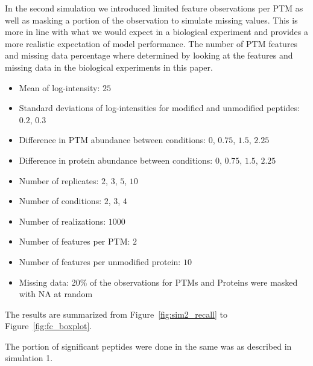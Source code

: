 \documentclass{mcp}
\def\sfigref#1{{Figure~\ref{#1}}}
\begin{document}
In the second simulation we introduced limited feature observations per PTM as well as masking a portion of the observation to simulate missing values. This is more in line with what we would expect in a biological experiment and provides a more realistic expectation of model performance. The number of PTM features and missing data percentage where determined by looking at the features and missing data in the biological experiments in this paper.

\begin{itemize}
\item Mean of log-intensity: $25$
\item Standard deviations of log-intensities for modified and unmodified peptides: $0.2$, $0.3$
\item Difference in PTM abundance between conditions: $0$, $0.75$, $1.5$, $2.25$
\item Difference in protein abundance between conditions: $0$, $0.75$, $1.5$, $2.25$
\item Number of replicates: $2$, $3$, $5$, $10$
\item Number of conditions: $2$, $3$, $4$
\item Number of realizations: $1000$
\item Number of features per PTM: $2$
\item Number of features per unmodified protein: $10$
\item Missing data: 20\% of the observations for PTMs and Proteins were masked with NA at random
\end{itemize}

The results are summarized from \sfigref{fig:sim2_recall} to \sfigref{fig:fc_boxplot}.

The portion of significant peptides were done in the same was as described in simulation 1.
\end{document}
